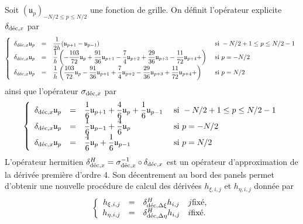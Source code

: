 Soit $(\mathfrak{u}_p)_{-N/2 \leq p \leq N/2}$ une fonction de grille. On définit l'opérateur explicite $\delta_{\dec,x}$ par
\begin{equation}
\left\lbrace
\begin{array}{rcll}
\delta_{\dec,x} \mathfrak{u}_p & = & \dfrac{1}{2 h} (\mathfrak{u}_{p+1}-\mathfrak{u}_{p-1}) & \text{ si } -N/2+1 \leq p \leq N/2-1 \\
\delta_{\dec,x} \mathfrak{u}_p & = & \dfrac{1}{h} \left( -\dfrac{103}{72} \mathfrak{u}_p + \dfrac{91}{36} \mathfrak{u}_{p+1} - \dfrac{7}{4} \mathfrak{u}_{p+2} + \dfrac{29}{36} \mathfrak{u}_{p+3} - \dfrac{11}{72} \mathfrak{u}_{p+4} +\right) & \text{ si } p = -N/2 \\
\delta_{\dec,x} \mathfrak{u}_p & = & \dfrac{1}{h} \left( \dfrac{103}{72} \mathfrak{u}_p - \dfrac{91}{36} \mathfrak{u}_{p+1} + \dfrac{7}{4} \mathfrak{u}_{p+2} - \dfrac{29}{36} \mathfrak{u}_{p+3} + \dfrac{11}{72} \mathfrak{u}_{p+4} +\right) & \text{ si } p = N/2 \\
\end{array}
\right.
\end{equation}
ainsi que l'opérateur $\sigma_{\dec,x}$ par
\begin{equation}
\left\lbrace
\begin{array}{rcll}
\delta_{\dec,x} \mathfrak{u}_p & = & \dfrac{1}{6} \mathfrak{u}_{p+1} + \dfrac{4}{6} \mathfrak{u}_{p} + \dfrac{1}{6} \mathfrak{u}_{p-1} & \text{ si } -N/2+1 \leq p \leq N/2-1 \\
\delta_{\dec,x} \mathfrak{u}_p & = & \dfrac{1}{6} \mathfrak{u}_{p-1} + \dfrac{4}{6} \mathfrak{u}_{p} & \text{ si } p = -N/2 \\
\delta_{\dec,x} \mathfrak{u}_p & = & \dfrac{4}{6} \mathfrak{u}_{p} + \dfrac{1}{6} \mathfrak{u}_{p-1} & \text{ si } p = N/2 \\
\end{array}
\right.
\end{equation}
L'opérateur hermitien $\delta^H_{\dec,x} = \sigma_{\dec,x}^{-1} \circ \delta_{\dec,x}$ est un opérateur d'approximation de la dérivée première d'ordre 4. Son décentrement au bord des panels permet d'obtenir une nouvelle procédure de calcul des dérivées $h_{\xi,i,j}$ et $h_{\eta,i,j}$ donnée par 
\begin{equation}
\left\lbrace
\begin{array}{rcll}
h_{\xi,i,j} & = & \delta^H_{\dec,\Delta \xi} h_{i,j} & j \text{fixé,}\\
h_{\eta,i,j} & = & \delta^H_{\dec,\Delta \eta} h_{i,j} & i \text{fixé.}
\end{array}
\right.
\end{equation}
